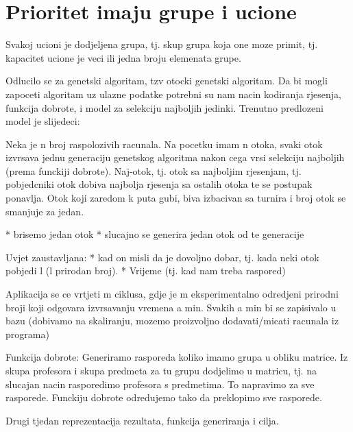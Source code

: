     \section{Prioritet imaju grupe i ucione}
    Svakoj ucioni je dodjeljena grupa, tj. skup grupa koja one moze primit, tj. kapacitet ucione je veci ili jedna broju elemenata grupe.


Odlucilo se za genetski algoritam, tzv otocki genetski algoritam. Da bi mogli zapoceti algoritam uz ulazne podatke potrebni su nam nacin kodiranja rjesenja, funkcija dobrote, i model za selekciju najboljih jedinki. Trenutno predlozeni model je slijedeci:

Neka je n broj raspolozivih racunala. Na pocetku imam n otoka, svaki otok izvrsava jednu generaciju genetskog algoritma nakon cega vrsi selekciju najboljih (prema funckiji dobrote). Naj-otok, tj. otok sa najboljim rjesenjam, tj. pobjedcniki otok dobiva najbolja rjesenja sa ostalih otoka te se postupak ponavlja. Otok koji zaredom k puta gubi, biva izbacivan sa turnira i broj otok se smanjuje za jedan.

* brisemo jedan otok
* slucajno se generira jedan otok od te generacije

Uvjet zaustavljana:
* kad on misli da je dovoljno dobar, tj. kada neki otok pobjedi l (l prirodan broj).
* Vrijeme (tj. kad nam treba raspored)

Aplikacija se ce vrtjeti m ciklusa, gdje je m eksperimentalno odredjeni prirodni broji koji odgovara izvrsavanju vremena a min. Svakih a min bi se zapisivalo u bazu (dobivamo na skaliranju, mozemo proizvoljno dodavati/micati racunala iz programa)


Funkcija dobrote: Generiramo rasporeda koliko imamo grupa u obliku matrice. Iz skupa profesora i skupa predmeta za tu grupu dodjelimo u matricu, tj. na slucajan nacin rasporedimo profesora s predmetima. To napravimo za sve rasporede. Funckiju dobrote odredujemo tako da preklopimo sve rasporede.

Drugi tjedan reprezentacija rezultata, funkcija generiranja i cilja.
